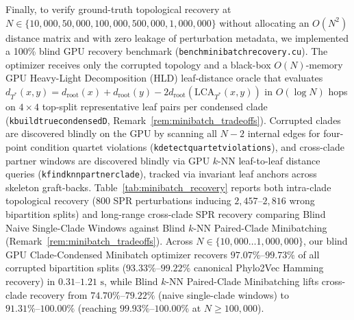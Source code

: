 \documentclass[11pt,a4paper]{article}
\makeatletter
\DeclareRobustCommand{\_}{\ifmmode\nfss@text{\textunderscore}\else\textunderscore\allowbreak\fi}
\theoremstyle{definition}
\makeatother
\begin{document}
Finally, to verify ground-truth topological recovery at $N \in \{10{,}000, 50{,}000, 100{,}000, 500{,}000, 1{,}000{,}000\}$ without allocating an $O(N^2)$ distance matrix and with zero leakage of perturbation metadata, we implemented a 100\% blind GPU recovery benchmark (\texttt{bench\_minibatch\_recovery.cu}). The optimizer receives only the corrupted topology and a black-box $O(N)$-memory GPU Heavy-Light Decomposition (HLD) leaf-distance oracle that evaluates $d_{T^*}(x,y) = d_{\text{root}}(x) + d_{\text{root}}(y) - 2 d_{\text{root}}(\text{LCA}_{T^*}(x,y))$ in $O(\log N)$ hops on $4 \times 4$ top-split representative leaf pairs per condensed clade (\texttt{k\_build\_true\_condensed\_D}, Remark~\ref{rem:minibatch_tradeoffs}). Corrupted clades are discovered blindly on the GPU by scanning all $N-2$ internal edges for four-point condition quartet violations (\texttt{k\_detect\_quartet\_violations}), and cross-clade partner windows are discovered blindly via GPU $k$-NN leaf-to-leaf distance queries (\texttt{k\_find\_knn\_partner\_clade}), tracked via invariant leaf anchors across skeleton graft-backs. Table~\ref{tab:minibatch_recovery} reports both intra-clade topological recovery ($800$ SPR perturbations inducing $2{,}457\text{--}2{,}816$ wrong bipartition splits) and long-range cross-clade SPR recovery comparing Blind Naive Single-Clade Windows against Blind $k$-NN Paired-Clade Minibatching (Remark~\ref{rem:minibatch_tradeoffs}). Across $N \in \{10{,}000 \dots 1{,}000{,}000\}$, our blind GPU Clade-Condensed Minibatch optimizer recovers $\mathbf{97.07\%\text{--}99.73\%}$ of all corrupted bipartition splits ($\mathbf{93.33\%\text{--}99.22\%}$ canonical Phylo2Vec Hamming recovery) in $0.31\text{--}1.21\text{ s}$, while Blind $k$-NN Paired-Clade Minibatching lifts cross-clade recovery from $74.70\%\text{--}79.22\%$ (naive single-clade windows) to $\mathbf{91.31\%\text{--}100.00\%}$ (reaching $\mathbf{99.93\%\text{--}100.00\%}$ at $N \ge 100{,}000$).
\end{document}
